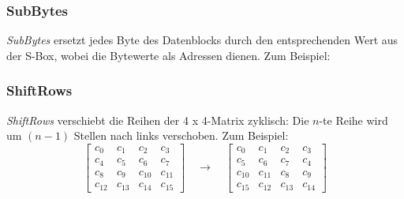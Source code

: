 \subsubsection{SubBytes}
\textit{SubBytes} ersetzt jedes Byte des Datenblocks durch den entsprechenden Wert aus der S-Box, wobei die Bytewerte als Adressen dienen. Zum Beispiel:
\begin{table}[H]
    \caption{Ausschnitt einer S-Box im AES-Algorithmus \\ („X“ ist ein Platzhalter)}
\end{table}



\subsubsection{ShiftRows}
\textit{ShiftRows} verschiebt die Reihen der 4 x 4-Matrix zyklisch: Die $n$-te Reihe wird um $(n-1)$ Stellen nach links verschoben. Zum Beispiel:
\[
\begin{bmatrix}
c_0  & c_1  & c_2  & c_3  \\
c_4  & c_5  & c_6  & c_7  \\
c_8  & c_9  & c_{10} & c_{11} \\
c_{12} & c_{13} & c_{14} & c_{15}
\end{bmatrix}
\quad\rightarrow\quad
\begin{bmatrix}
c_0  & c_1  & c_2  & c_3  \\
c_5  & c_6  & c_7  & c_4  \\
c_{10} & c_{11} & c_8  & c_9  \\
c_{15} & c_{12} & c_{13} & c_{14}
\end{bmatrix}
\]

